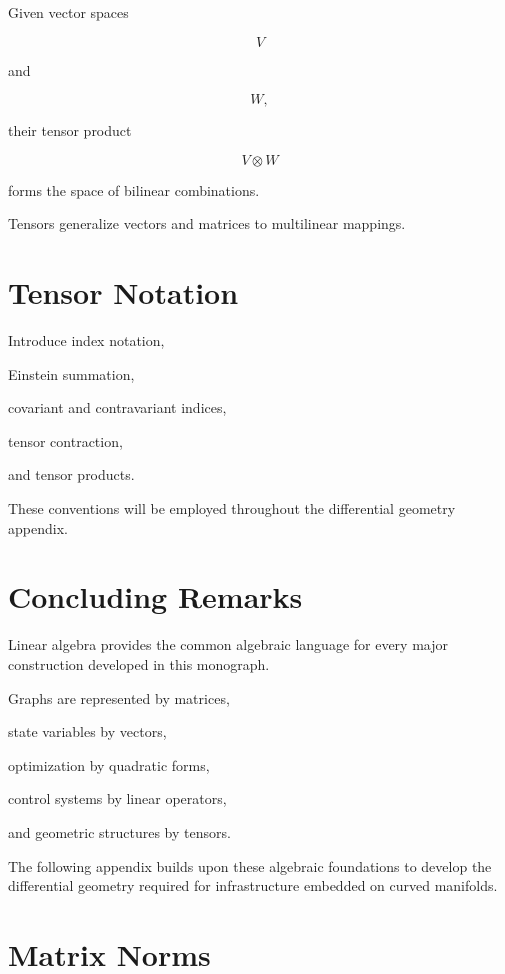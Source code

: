 \documentclass[11pt,fleqn]{book}
\numberwithin{equation}{chapter}
\theoremstyle{plain}
\theoremstyle{definition}
\theoremstyle{remark}
\begin{document}
Given vector spaces

\[
V
\]

and

\[
W,
\]

their tensor product

\[
V\otimes W
\]

forms the space of bilinear combinations.

Tensors generalize vectors and matrices to multilinear mappings.


\section{Tensor Notation}

Introduce index notation,

Einstein summation,

covariant and contravariant indices,

tensor contraction,

and tensor products.

These conventions will be employed throughout the differential geometry
appendix.


\section{Concluding Remarks}

Linear algebra provides the common algebraic language for every major
construction developed in this monograph.

Graphs are represented by matrices,

state variables by vectors,

optimization by quadratic forms,

control systems by linear operators,

and geometric structures by tensors.

The following appendix builds upon these algebraic foundations to
develop the differential geometry required for infrastructure embedded
on curved manifolds.


\section{Matrix Norms}
\end{document}
